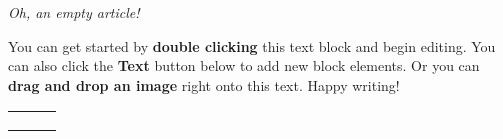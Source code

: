\textit{Oh, an empty article!}

You can get started by \textbf{double clicking} this text block and begin editing. You can also click the \textbf{Text} button below to add new block elements. Or you can \textbf{drag and drop an image} right onto this text. Happy writing!
\begin{table} 
    \begin{tabular}{ c c c }
         &  &  \\ 
         &  &  \\ 
         &  &  \\ 
    \end{tabular} 
\end{table}